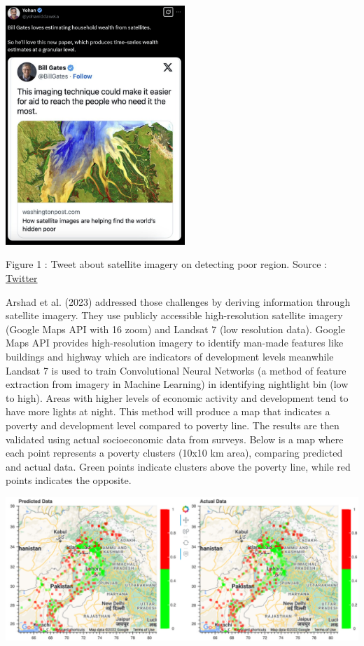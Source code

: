 \documentclass[
  letterpaper,
  DIV=11,
  numbers=noendperiod]{scrreprt}
\begin{document}
\includegraphics[width=2.66667in,height=\textheight]{images/clipboard-3275173560.png}

Figure 1 : Tweet about satellite imagery on detecting poor region.
Source :
\href{https://x.com/yohaniddawela/status/1857398431146299437}{Twitter}

Arshad et al. (2023) addressed those challenges by deriving information
through satellite imagery. They use publicly accessible high-resolution
satellite imagery (Google Maps API with 16 zoom) and Landsat 7 (low
resolution data). Google Maps API provides high-resolution imagery to
identify man-made features like buildings and highway which are
indicators of development levels meanwhile Landsat 7 is used to train
Convolutional Neural Networks (a method of feature extraction from
imagery in Machine Learning) in identifying nightlight bin (low to
high). Areas with higher levels of economic activity and development
tend to have more lights at night. This method will produce a map that
indicates a poverty and development level compared to poverty line. The
results are then validated using actual socioeconomic data from surveys.
Below is a map where each point represents a poverty clusters (10x10 km
area), comparing predicted and actual data. Green points indicate
clusters above the poverty line, while red points indicates the
opposite.

\includegraphics[width=6.25in,height=\textheight]{images/clipboard-4160873008.png}
\end{document}
